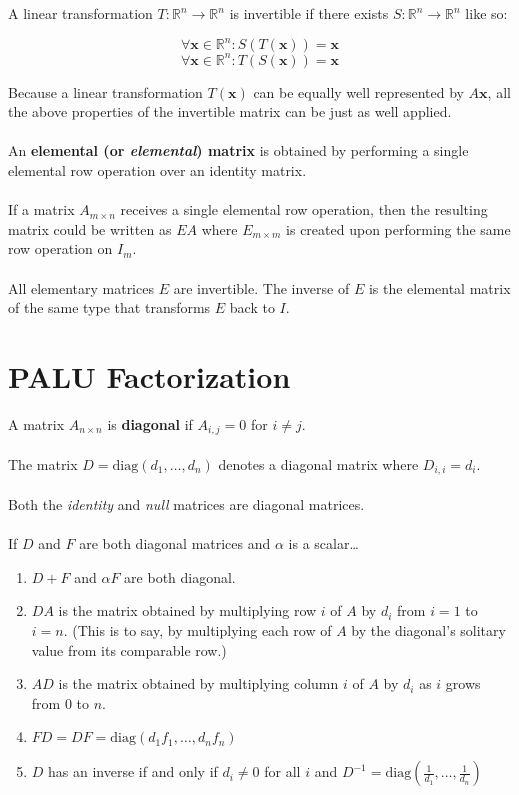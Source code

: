 \documentclass[12pt]{article}
\newcommand{\R}{\mathbb{R}}
\newcommand{\bt}[1]{\textbf{{#1}}}
\newcommand{\bm}[1]{\mathbf{{#1}}}
\begin{document}
A linear transformation $T: \R^n \rightarrow \R^n$ is invertible if there exists
$S: \R^n \rightarrow \R^n$ like so:

$$\forall \bm{x} \in \R^n: S(T(\bm{x})) = \bm{x}$$
$$\forall \bm{x} \in \R^n: T(S(\bm{x})) = \bm{x}$$

Because a linear transformation $T(\bm{x})$ can be equally well represented by $A\bm{x}$, all the above
properties of the invertible matrix can be just as well applied. \\ \\

An \textbf{elemental (or \emph{elemental}) matrix} is obtained by performing a single elemental
row operation over an identity matrix. \\ \\

If a matrix $A_{m \times n}$ receives a single elemental row operation, then the resulting matrix
could be written as $EA$ where $E_{m\times m}$ is created upon performing the same row operation on $I_m$. \\ \\

All elementary matrices $E$ are invertible. The inverse of $E$ is the elemental matrix of the
same type that transforms $E$ back to $I$.

\section*{PALU Factorization}

A matrix $A_{n\times n}$ is \bt{diagonal} if $A_{i,j} = 0$ for $i \neq j$. \\ \\

The matrix $D = \textrm{diag}(d_1,\dots,d_n)$ denotes a diagonal matrix where $D_{i,i} = d_i$. \\ \\

Both the \emph{identity} and \emph{null} matrices are diagonal matrices. \\ \\

If $D$ and $F$ are both diagonal matrices and $\alpha$ is a scalar\dots

\begin{enumerate}
    \item $D + F$ and $\alpha F$ are both diagonal.
    \item $DA$ is the matrix obtained by multiplying row $i$ of $A$ by $d_i$ from $i = 1$ to $i = n$.
    (This is to say, by multiplying each row of $A$ by the diagonal's solitary value from its comparable row.)
    \item $AD$ is the matrix obtained by multiplying column $i$ of $A$ by $d_i$ as $i$ grows from $0$ to $n$.
    \item $FD = DF = \textrm{diag}(d_1f_1,\dots,d_nf_n)$
    \item $D$ has an inverse if and only if $d_i \neq 0$ for all $i$ and $D^{-1} = \textrm{diag}(\frac{1}{d_1},\dots,\frac{1}{d_n})$
\end{enumerate}
\end{document}
